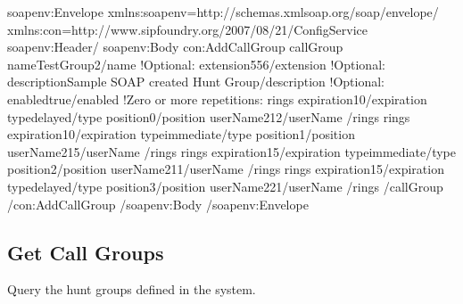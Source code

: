 \documentclass[letterpaper,10pt,english]{sphinxmanual}
\begin{document}
\begin{sphinxVerbatim}[commandchars=\\\{\}]
\PYGZlt{}soapenv:Envelope xmlns:soapenv=\PYGZdq{}http://schemas.xmlsoap.org/soap/envelope/\PYGZdq{} xmlns:con=\PYGZdq{}http://www.sipfoundry.org/2007/08/21/ConfigService\PYGZdq{}\PYGZgt{}
\PYGZlt{}soapenv:Header/\PYGZgt{}
\PYGZlt{}soapenv:Body\PYGZgt{}
\PYGZlt{}con:AddCallGroup\PYGZgt{}
\PYGZlt{}callGroup\PYGZgt{}
\PYGZlt{}name\PYGZgt{}TestGroup2\PYGZlt{}/name\PYGZgt{}
\PYGZlt{}!\PYGZhy{}Optional:\PYGZhy{}\PYGZgt{}
\PYGZlt{}extension\PYGZgt{}556\PYGZlt{}/extension\PYGZgt{}
\PYGZlt{}!\PYGZhy{}Optional:\PYGZhy{}\PYGZgt{}
\PYGZlt{}description\PYGZgt{}Sample SOAP created Hunt Group\PYGZlt{}/description\PYGZgt{}
\PYGZlt{}!\PYGZhy{}Optional:\PYGZhy{}\PYGZgt{}
\PYGZlt{}enabled\PYGZgt{}true\PYGZlt{}/enabled\PYGZgt{}
\PYGZlt{}!\PYGZhy{}Zero or more repetitions:\PYGZhy{}\PYGZgt{}
\PYGZlt{}rings\PYGZgt{}
\PYGZlt{}expiration\PYGZgt{}10\PYGZlt{}/expiration\PYGZgt{}
\PYGZlt{}type\PYGZgt{}delayed\PYGZlt{}/type\PYGZgt{}
\PYGZlt{}position\PYGZgt{}0\PYGZlt{}/position\PYGZgt{}
\PYGZlt{}userName\PYGZgt{}212\PYGZlt{}/userName\PYGZgt{}
\PYGZlt{}/rings\PYGZgt{}
\PYGZlt{}rings\PYGZgt{}
\PYGZlt{}expiration\PYGZgt{}10\PYGZlt{}/expiration\PYGZgt{}
\PYGZlt{}type\PYGZgt{}immediate\PYGZlt{}/type\PYGZgt{}
\PYGZlt{}position\PYGZgt{}1\PYGZlt{}/position\PYGZgt{}
\PYGZlt{}userName\PYGZgt{}215\PYGZlt{}/userName\PYGZgt{}
\PYGZlt{}/rings\PYGZgt{}
\PYGZlt{}rings\PYGZgt{}
\PYGZlt{}expiration\PYGZgt{}15\PYGZlt{}/expiration\PYGZgt{}
\PYGZlt{}type\PYGZgt{}immediate\PYGZlt{}/type\PYGZgt{}
\PYGZlt{}position\PYGZgt{}2\PYGZlt{}/position\PYGZgt{}
\PYGZlt{}userName\PYGZgt{}211\PYGZlt{}/userName\PYGZgt{}
\PYGZlt{}/rings\PYGZgt{}
\PYGZlt{}rings\PYGZgt{}
\PYGZlt{}expiration\PYGZgt{}15\PYGZlt{}/expiration\PYGZgt{}
\PYGZlt{}type\PYGZgt{}delayed\PYGZlt{}/type\PYGZgt{}
\PYGZlt{}position\PYGZgt{}3\PYGZlt{}/position\PYGZgt{}
\PYGZlt{}userName\PYGZgt{}221\PYGZlt{}/userName\PYGZgt{}
\PYGZlt{}/rings\PYGZgt{}
\PYGZlt{}/callGroup\PYGZgt{}
\PYGZlt{}/con:AddCallGroup\PYGZgt{}
\PYGZlt{}/soapenv:Body\PYGZgt{}
\PYGZlt{}/soapenv:Envelope\PYGZgt{}
\end{sphinxVerbatim}


\subsection{Get Call Groups}
\label{\detokenize{soapapi:get-call-groups}}
 

 Query the hunt groups defined in the system.
\end{document}
